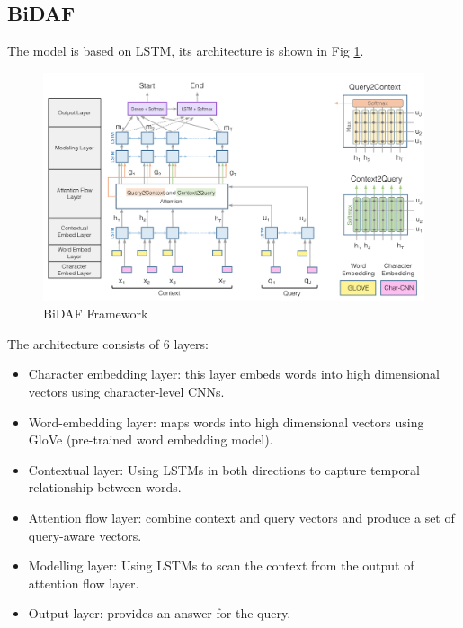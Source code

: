 \documentclass[paper=a4, fontsize=11pt]{scrartcl} %
\begin{document}
\subsection{BiDAF}
The model is based on LSTM, its architecture is shown in Fig \ref{fig:bidaf}.
\begin{figure}[!htb]\centering
	\includegraphics[scale=0.5]{bidaf.png}
	\caption{BiDAF Framework}
	\label{fig:bidaf}
\end{figure}
The architecture consists of 6 layers:
\begin{itemize}
	\item Character embedding layer: this layer embeds words into high dimensional vectors using character-level CNNs.
	\item Word-embedding layer: maps words into high dimensional vectors using GloVe (pre-trained word embedding model).
	\item Contextual layer: Using LSTMs in both directions to capture temporal relationship between words.
	\item Attention flow layer: combine context and query vectors and produce a set of query-aware vectors.
	\item Modelling layer: Using LSTMs to scan the context from the output of attention flow layer.
	\item Output layer: provides an answer for the query.
\end{itemize}
\end{document}
